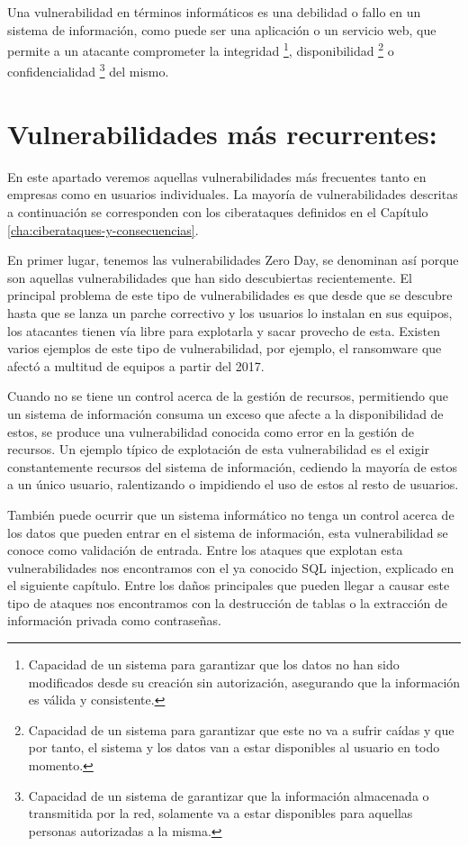 Una vulnerabilidad en términos informáticos es una debilidad o fallo en un sistema de información, como puede ser una aplicación o un servicio web, que permite a un atacante comprometer la integridad \footnote{Capacidad de un sistema para garantizar que los datos no han sido modificados desde su creación sin autorización, asegurando que la información es válida y consistente.}, disponibilidad \footnote{Capacidad de un sistema para garantizar que este no va a sufrir caídas y que por tanto, el sistema y los datos van a estar disponibles al usuario en todo momento.} o confidencialidad \footnote{Capacidad de un sistema de garantizar que la información almacenada o transmitida por la red, solamente va a estar disponibles para aquellas personas autorizadas a la misma.} del mismo.

\section{Vulnerabilidades más recurrentes:}
En este apartado veremos aquellas vulnerabilidades más frecuentes tanto en empresas como en usuarios individuales. La mayoría de vulnerabilidades descritas a continuación se corresponden con los ciberataques definidos en el Capítulo \ref{cha:ciberataques-y-consecuencias}.

En primer lugar, tenemos las vulnerabilidades Zero Day, se denominan así porque son aquellas 
vulnerabilidades que han sido descubiertas recientemente. El principal problema de este tipo de 
vulnerabilidades es que desde que se descubre hasta que se lanza un parche correctivo y los 
usuarios lo instalan en sus equipos, los atacantes tienen vía libre para explotarla y sacar provecho 
de esta. Existen varios ejemplos de este tipo de vulnerabilidad, por ejemplo, el ransomware que afectó a 
multitud de equipos a partir del 2017.

Cuando no se tiene un control acerca de la gestión de recursos, permitiendo que un sistema de información consuma un exceso que afecte a la disponibilidad de estos, se produce una vulnerabilidad conocida como error en la gestión de recursos. Un ejemplo típico de explotación de esta vulnerabilidad es el exigir constantemente recursos del sistema de información, cediendo la mayoría de estos a un único usuario, ralentizando o impidiendo el uso de estos al resto de usuarios.

También puede ocurrir que un sistema informático no tenga un control acerca de los datos que pueden entrar en el sistema de información, esta vulnerabilidad se conoce como validación de entrada. Entre los ataques que explotan esta vulnerabilidades nos encontramos con el ya conocido SQL injection, explicado en el siguiente capítulo. Entre los daños principales que pueden llegar a causar este tipo de ataques nos encontramos con la destrucción de tablas o la extracción de información privada como contraseñas.

